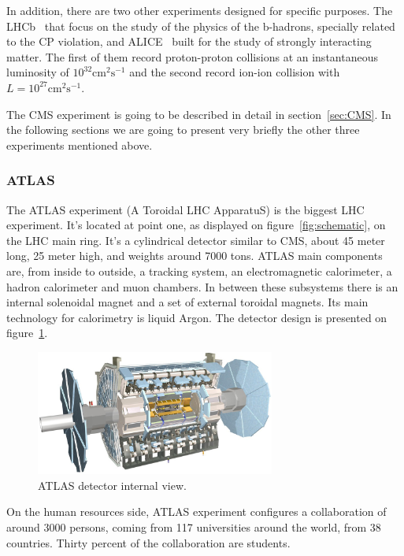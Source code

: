 In addition, there are two other experiments designed for specific purposes. The LHCb~\cite{Alves:2008zz} that focus on the study of the physics of the b-hadrons, specially related to the CP violation, and ALICE~\cite{Cortese:879894} built for the study of strongly interacting matter. The first of them record proton-proton collisions at an instantaneous luminosity of $10^{32}\text{cm}^{2}\text{s}^{-1}$ and the second record ion-ion collision with $L = 10^{27}\text{cm}^{2}\text{s}^{-1}$.

The CMS experiment is going to be described in detail in section~\ref{sec:CMS}. In the following sections we are going to present very briefly the other three experiments mentioned above. 

\subsubsection{ATLAS}
\label{sec:atlas}

The ATLAS experiment (A Toroidal LHC ApparatuS) is the biggest LHC experiment. It's located at point one, as displayed on figure~\ref{fig:schematic}, on the LHC main ring. It's a cylindrical detector similar to CMS, about 45 meter long, 25 meter high, and weights around 7000 tons. ATLAS main components are, from inside to outside, a tracking system, an electromagnetic calorimeter, a hadron calorimeter and muon chambers. In between these subsystems there is an internal solenoidal magnet and a set of external toroidal magnets. Its main technology for calorimetry is liquid Argon. The detector design is presented on figure~\ref{fig:atlasdet}.

\begin{figure}[!Hhtbp]
  \begin{center}
    \includegraphics[width=0.7\textwidth]{figs/atlas_lg.jpg}
    \caption{ATLAS detector internal view. }
    \label{fig:atlasdet}
  \end{center}
\end{figure}

On the human resources side, ATLAS experiment configures a collaboration of around 3000 persons, coming from 117 universities around the world, from 38 countries. Thirty percent of the collaboration are students.  

